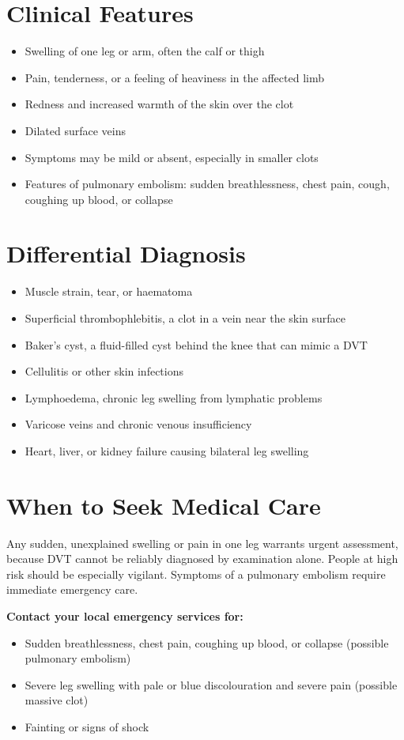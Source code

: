 \section*{Clinical Features}
\begin{itemize}
    \item Swelling of one leg or arm, often the calf or thigh
    \item Pain, tenderness, or a feeling of heaviness in the affected limb
    \item Redness and increased warmth of the skin over the clot
    \item Dilated surface veins
    \item Symptoms may be mild or absent, especially in smaller clots
    \item Features of pulmonary embolism: sudden breathlessness, chest pain, cough, coughing up blood, or collapse
\end{itemize}

\section*{Differential Diagnosis}
\begin{itemize}
    \item Muscle strain, tear, or haematoma
    \item Superficial thrombophlebitis, a clot in a vein near the skin surface
    \item Baker's cyst, a fluid-filled cyst behind the knee that can mimic a DVT
    \item Cellulitis or other skin infections
    \item Lymphoedema, chronic leg swelling from lymphatic problems
    \item Varicose veins and chronic venous insufficiency
    \item Heart, liver, or kidney failure causing bilateral leg swelling
\end{itemize}

\section*{When to Seek Medical Care}
Any sudden, unexplained swelling or pain in one leg warrants urgent assessment, because DVT cannot be reliably diagnosed by examination alone. People at high risk should be especially vigilant. Symptoms of a pulmonary embolism require immediate emergency care.

\textbf{Contact your local emergency services for:}
\begin{itemize}
    \item Sudden breathlessness, chest pain, coughing up blood, or collapse (possible pulmonary embolism)
    \item Severe leg swelling with pale or blue discolouration and severe pain (possible massive clot)
    \item Fainting or signs of shock
\end{itemize}


